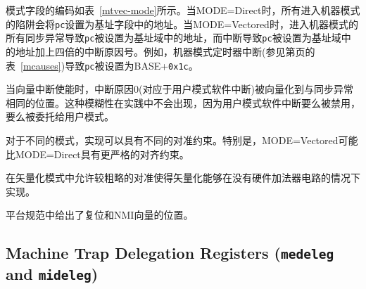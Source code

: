 模式字段的编码如表~\ref{mtvec-mode}所示。当MODE=Direct时，所有进入机器模式的陷阱会将{\tt pc}设置为基址字段中的地址。当MODE=Vectored时，进入机器模式的所有同步异常导致{\tt pc}被设置为基址域中的地址，而中断导致{\tt pc}被设置为基址域中的地址加上四倍的中断原因号。例如，机器模式定时器中断(参见第页的表~\ref{mcauses})导致{\tt pc}被设置为BASE+{\tt 0x1c}。

\iffalse
\begin{commentary}
When vectored interrupts are enabled, interrupt cause 0, which corresponds to
user-mode software interrupts, are vectored to the same location as
synchronous exceptions.  This ambiguity does not arise in practice, since
user-mode software interrupts are either disabled or delegated to user mode.
\end{commentary}
\fi

\begin{commentary}
当向量中断使能时，中断原因0(对应于用户模式软件中断)被向量化到与同步异常相同的位置。这种模糊性在实践中不会出现，因为用户模式软件中断要么被禁用，要么被委托给用户模式。
\end{commentary}

\iffalse
An implementation may have different alignment constraints for
different modes.  In particular, MODE=Vectored may have stricter
alignment constraints than MODE=Direct.
\fi

对于不同的模式，实现可以具有不同的对准约束。特别是，MODE=Vectored可能比MODE=Direct具有更严格的对齐约束。

\iffalse
\begin{commentary}
  Allowing coarser alignments in Vectored mode enables vectoring to be
  implemented without a hardware adder circuit.
\end{commentary}
\fi

\begin{commentary}
  在矢量化模式中允许较粗略的对准使得矢量化能够在没有硬件加法器电路的情况下实现。
\end{commentary}

\iffalse
\begin{commentary}
Reset and NMI vector locations are given in a platform specification.
\end{commentary}
\fi

\begin{commentary}
平台规范中给出了复位和NMI向量的位置。
\end{commentary}

\subsection{Machine Trap Delegation Registers ({\tt medeleg} and {\tt mideleg})}

